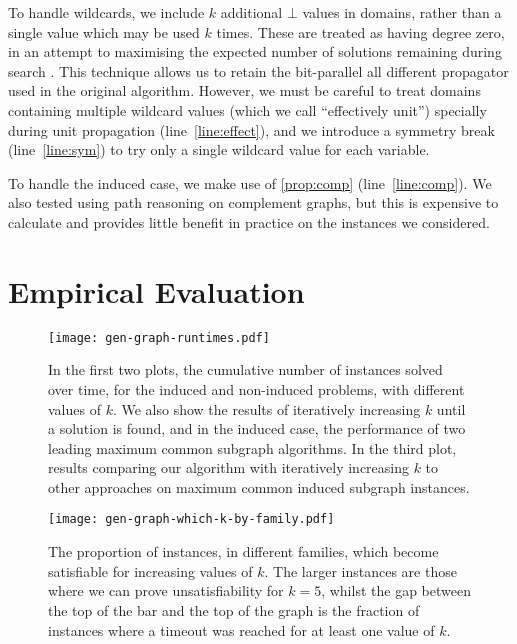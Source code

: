 \documentclass[letterpaper]{article}
\theoremstyle{definition}
\begin{document}
To handle wildcards, we include $k$ additional $\bot$ values in domains, rather than a single value
which may be used $k$ times. These are treated as having degree zero, in an attempt to maximising
the expected number of solutions remaining during search \cite{DBLP:conf/ijcai/McCreeshPT16}. This
technique allows us to retain the bit-parallel all different propagator used in the original
algorithm. However, we must be careful to treat domains containing multiple wildcard values (which
we call ``effectively unit'') specially during unit propagation (line~\ref{line:effect}), and we
introduce a symmetry break (line~\ref{line:sym}) to try only a single wildcard value for each
variable.

To handle the induced case, we make use of \cref{prop:comp} (line~\ref{line:comp}). We also tested
using path reasoning on complement graphs, but this is expensive to calculate and provides little
benefit in practice on the instances we considered.

\section{Empirical Evaluation}\label{section:evaluation}

\begin{figure*}[tb]
    \centering
    \texttt{[image: gen-graph-runtimes.pdf]}
    \caption{In the first two plots, the cumulative number of instances solved over time, for the
        induced and non-induced problems, with different values of $k$. We also show the results of
        iteratively increasing $k$ until a solution is found, and in the induced case, the
        performance of two leading maximum common subgraph algorithms. In the third plot, results
        comparing our algorithm with iteratively increasing $k$ to other approaches on maximum
        common induced subgraph instances.}\label{figure:runtimes}
\end{figure*}

\begin{figure*}[tb]
    \centering
    \texttt{[image: gen-graph-which-k-by-family.pdf]}
    \caption{The proportion of instances, in different families, which become satisfiable for
    increasing values of $k$. The larger instances are those where we can prove unsatisfiability for
    $k = 5$, whilst the gap between the top of the bar and the top of the graph is the fraction of
    instances where a timeout was reached for at least one value of $k$.}\label{figure:which-k}
\end{figure*}
\end{document}
